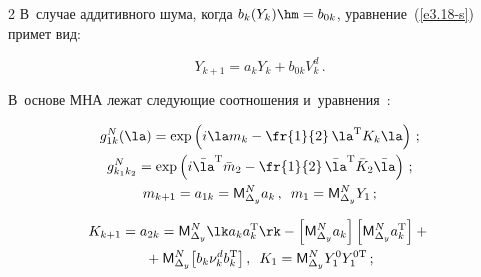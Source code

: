 \begin{multicols}{2}
В~случае аддитивного шума, когда $b_k (Y_k) \hm= b_{0k}$, уравнение~(\ref{e3.18-s}) примет вид:

    \begin{equation}

    Y_{k+1} = a_k Y_k + b_{0k} V_k^d\,.\label{e3.19-s}

    \end{equation}



В~основе МНА лежат следующие соотношения и~уравнения~\cite{4-s, 10-s}:

   \begin{gather*}

        g_{1k}^N (\la) = \exp \left( i\la m_k -\fr {1}{2}\, \la^{\mathrm{T}} K_k \la\right)\,;\\

     g_{k_1k_2}^N = \exp\left( i\bar \la^{\mathrm{T}} \bar m_2 - \fr{1}{ 2}\, \bar \la^{\mathrm{T}} \bar K_2 \bar \la\right)\,;


     \\

    m_{k+1}= a_{1k}= {\sf M}_{\Delta_y}^N a_k\,,\enskip m_1 = {\sf M}_{\Delta_y}^NY_1\,; %

    \end{gather*}



    \vspace*{-10pt}



    \noindent

    \begin{multline*}

    K_{k+1} = a_{2k} ={\sf M}_{\Delta_y}^N \lk a_k a_k^{\mathrm{T}}\rk -\left[ {\sf M}_{\Delta_y}^Na_k\right] \left[ {\sf M}_{\Delta_y}^Na_k^{\mathrm{T}}\right]+{}\\

    {}+

     {\sf M}_{\Delta_y}^N\! \left[ b_k \nu_k^d b_k^{\mathrm{T}}\right], \enskip

         K_1 ={\sf M}_{\Delta_y}^N Y_1^0 Y_1^{0\mathrm{T}}\,;

\end{multline*}



\vspace*{-12pt}



    \noindent


\end{multicols}
